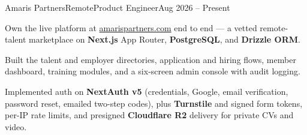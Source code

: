 \begin{cvjob}{Amaris Partners}{Remote}{Product Engineer}{Aug 2026 -- Present}
  \item Own the live platform at \href{https://amarispartners.com}{amarispartners.com} end to end --- a vetted remote-talent marketplace on \textbf{Next.js} App Router, \textbf{PostgreSQL}, and \textbf{Drizzle ORM}.
  \item Built the talent and employer directories, application and hiring flows, member dashboard, training modules, and a six-screen admin console with audit logging.
  \item Implemented auth on \textbf{NextAuth v5} (credentials, Google, email verification, password reset, emailed two-step codes), plus \textbf{Turnstile} and signed form tokens, per-IP rate limits, and presigned \textbf{Cloudflare R2} delivery for private CVs and video.
\end{cvjob}
